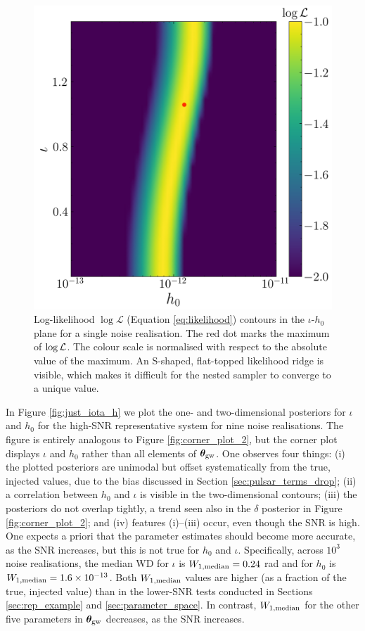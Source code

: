\documentclass[fleqn,usenatbib,useAMS]{mnras}
\begin{document}
\begin{figure}
	\centering
	\includegraphics[width=\columnwidth]{images/likelihood_surface}
	\caption{Log-likelihood $\log \mathcal{L}$ (Equation \ref{eq:likelihood}) contours in the $\iota$-$h_0$ plane for a single noise realisation. The red dot marks the maximum of $\log {\cal L}$. The colour scale is normalised with respect to the absolute value of the maximum. An S-shaped, flat-topped likelihood ridge is visible, which makes it difficult for the nested sampler to converge to a unique value.}
	\label{fig:likelihood_surface}
\end{figure}
In Figure \ref{fig:just_iota_h} we plot the one- and two-dimensional posteriors for $\iota$ and $h_0$ for the high-SNR representative system for nine noise realisations. The figure is entirely analogous to Figure \ref{fig:corner_plot_2}, but the corner plot displays $\iota$ and $h_0$ rather than all elements of $\boldsymbol{\theta}_{\rm gw}$. One observes four things: (i) the plotted posteriors are unimodal but offset systematically from the true, injected values, due to the bias discussed in Section \ref{sec:pulsar_terms_drop}; (ii) a correlation between $h_0$ and $\iota$ is visible in the two-dimensional contours; (iii) the posteriors do not overlap tightly, a trend seen also in the $\delta$ posterior in Figure \ref{fig:corner_plot_2}; and (iv) features (i)--(iii) occur, even though the SNR is high. One expects a priori that the parameter estimates should become more accurate, as the SNR increases, but this is not true for $h_0$ and $\iota$. Specifically, across $10^3$ noise realisations, the median WD for $\iota$ is $W_{1, \rm median}=0.24$ rad and for $h_0$ is  $W_{1, \rm median}=1.6 \times 10^{-13}$. Both $W_{1,{\rm median}}$ values are higher (as a fraction of the true, injected value) than in the lower-SNR tests conducted in Sections \ref{sec:rep_example} and \ref{sec:parameter_space}. In contrast, $W_{1,\rm median}$ for the other five parameters in $\boldsymbol{\theta}_{\rm gw}$ decreases, as the SNR increases. \newline 
\end{document}
